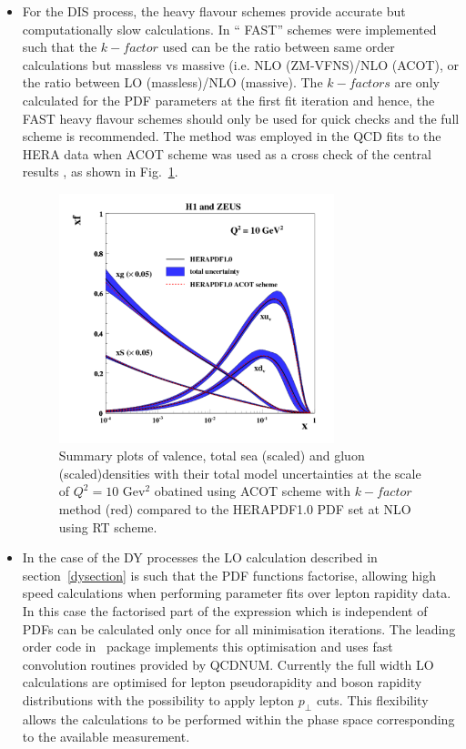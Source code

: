 \begin{description}
\begin{itemize}
\item For the DIS process, the heavy flavour schemes provide accurate but computationally slow calculations. In \fitter `` FAST'' schemes were implemented 
such that the $k-factor$ used can be
the ratio between same order calculations but massless vs massive 
(i.e. NLO (ZM-VFNS)/NLO (ACOT), or 
the ratio between LO (massless)/NLO (massive).
The $k-factors$ are only calculated for the PDF parameters at the first 
fit iteration
 and hence, the FAST heavy flavour schemes should only be used 
for quick checks and the full scheme is recommended.
The method was employed in the QCD fits to the HERA data when ACOT scheme was used as a cross check of the central results \cite{h1zeus:2009wt}, as shown in Fig.~\ref{fig:acotrt}.
\begin{figure}[!ht]
   \centering
   \includegraphics[width=8cm]{heraacot.pdf}
   \caption{Summary plots of valence, total sea (scaled) and gluon (scaled)densities with their total model uncertainties at the scale of $Q^2=10$ Gev$^2$ obatined using ACOT scheme with $k-factor$ method (red) compared to the HERAPDF1.0 PDF set at NLO using RT scheme.}
 \label{fig:acotrt}
\end{figure}



\item 
In the case of the DY processes the LO calculation described in section~\ref{dysection}
is such that the PDF functions factorise, allowing high speed calculations when 
performing parameter fits over lepton rapidity data. In this case
the factorised part of the expression which is independent of PDFs can be
calculated only once for all minimisation iterations.
The leading order code in \fitter\ package implements this 
optimisation and uses fast convolution routines provided by
QCDNUM. Currently the full width LO calculations are optimised 
for lepton pseudorapidity and boson rapidity distributions with the
possibility to apply lepton \(p_{\perp}\) cuts.
This flexibility allows the calculations to be performed within the phase space
corresponding to the available measurement.


\end{itemize}
\end{description}
